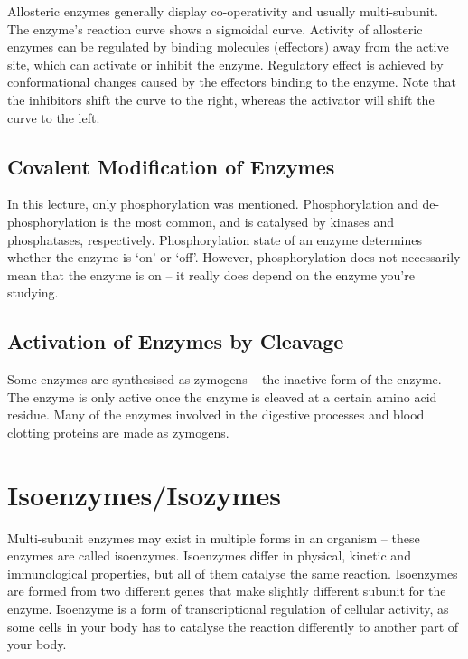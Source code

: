 Allosteric enzymes generally display co-operativity and usually multi-subunit.
The enzyme's reaction curve shows a sigmoidal curve.
Activity of allosteric enzymes can be regulated by binding molecules (effectors) away from the active site, which can activate or inhibit the enzyme.
Regulatory effect is achieved by conformational changes caused by the effectors binding to the enzyme.
Note that the inhibitors shift the curve to the right, whereas the activator will shift the curve to the left.

\subsection{Covalent Modification of Enzymes}

In this lecture, only phosphorylation was mentioned.
Phosphorylation and de-phosphorylation is the most common, and is catalysed by kinases and phosphatases, respectively.
Phosphorylation state of an enzyme determines whether the enzyme is `on' or `off'.
However, phosphorylation does not necessarily mean that the enzyme is on -- it really does depend on the enzyme you're studying.

\subsection{Activation of Enzymes by Cleavage}

Some enzymes are synthesised as zymogens -- the inactive form of the enzyme.
The enzyme is only active once the enzyme is cleaved at a certain amino acid residue.
Many of the enzymes involved in the digestive processes and blood clotting proteins are made as zymogens.

\section{Isoenzymes/Isozymes}

Multi-subunit enzymes may exist in multiple forms in an organism -- these enzymes are called isoenzymes.
Isoenzymes differ in physical, kinetic and immunological properties, but all of them catalyse the same reaction.
Isoenzymes are formed from two different genes that make slightly different subunit for the enzyme.
Isoenzyme is a form of transcriptional regulation of cellular activity, as some cells in your body has to catalyse the reaction differently to another part of your body.

